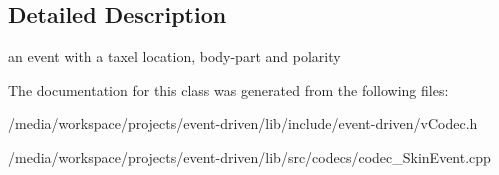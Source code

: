\subsection{Detailed Description}
an event with a taxel location, body-\/part and polarity 

The documentation for this class was generated from the following files\+:\begin{DoxyCompactItemize}
\item 
/media/workspace/projects/event-\/driven/lib/include/event-\/driven/v\+Codec.\+h\item 
/media/workspace/projects/event-\/driven/lib/src/codecs/codec\+\_\+\+Skin\+Event.\+cpp\end{DoxyCompactItemize}
